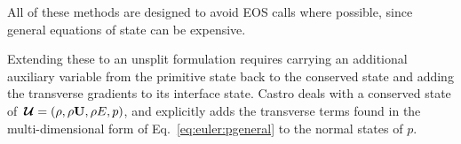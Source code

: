All of these methods are designed to avoid EOS calls where possible,
since general equations of state can be expensive.

Extending these to an unsplit formulation requires carrying an additional
auxiliary variable from the primitive state back to the conserved state
and adding the transverse gradients to its interface state.  Castro
deals with a conserved state of ${\,\boldsymbol{\mathcal{U}}} = (\rho, \rho {\bf U}, \rho E, p)$, and
explicitly adds the transverse terms found in the multi-dimensional form
of Eq.~\ref{eq:euler:pgeneral}
to the normal states of $p$.




